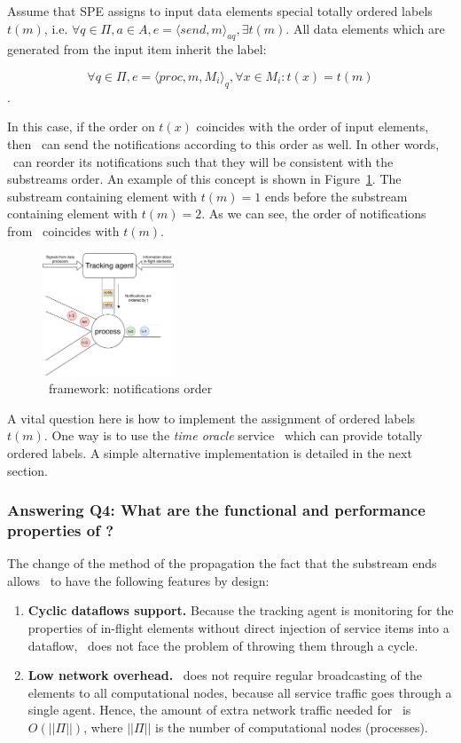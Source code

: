 Assume that SPE assigns to input data elements special totally ordered labels $t(m)$, i.e. $\forall q\in \Pi,a\in A, e=\langle send,m\rangle_{aq}, \exists t(m)$. All data elements which are generated from the input item inherit the label: 

$$\forall q\in \Pi, e=\langle proc,m,M_i\rangle_q, \forall x \in M_i : t(x) = t(m)$$.

In this case, if the order on $t(x)$ coincides with the order of input elements, then \tracker\ can send the notifications according to this order as well. In other words, \tracker\ can reorder its notifications such that they will be consistent with the substreams order. An example of this concept is shown in Figure~\ref{tracker_ordering}. The substream containing element with $t(m)=1$ ends before the substream containing element with $t(m)=2$. As we can see, the order of notifications from \tracker\ coincides with $t(m)$.

\begin{figure}[htbp]
  \centering
  \includegraphics[width=0.35\textwidth]{pics/tracker-ordering.pdf}
  \caption{\tracker\ framework: notifications order}
  \label{tracker_ordering}
\end{figure}

A vital question here is how to implement the assignment of ordered labels $t(m)$. One way is to use the {\em time oracle} service~\cite{10.14778/3055330.3055335} which can provide totally ordered labels. A simple alternative implementation is detailed in the next section. 

\subsubsection{Answering Q4: What are the functional and performance properties of \tracker?}

The change of the method of the propagation the fact that the substream ends allows \tracker\ to have the following features by design:

\begin{enumerate}
    \item {\bf Cyclic dataflows support.} Because the tracking agent is monitoring for the properties of in-flight elements without direct injection of service items into a dataflow, \tracker\ does not face the problem of throwing them through a cycle.
    \item {\bf Low network overhead.} \tracker\ does not require regular broadcasting of the elements to all computational nodes, because all service traffic goes through a single agent. Hence, the amount of extra network traffic needed for \tracker\ is $O(||\Pi||)$, where $||\Pi||$ is the number of computational nodes (processes). 
\end{enumerate}

